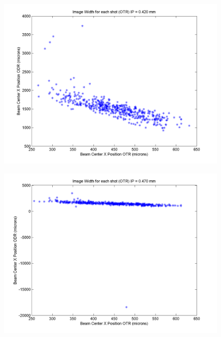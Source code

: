 \documentclass[12pt]{article}
\begin{document}
\begin{figure}
\begin{center}
\includegraphics[scale=0.5]{Figures/XPosition_OTRODR_420.PNG}
\caption{}
\end{center}
\end{figure}

\begin{figure}
\begin{center}
\includegraphics[scale=0.5]{Figures/XPosition_OTRODR_470.PNG}
\caption{}
\end{center}
\end{figure}
\end{document}
